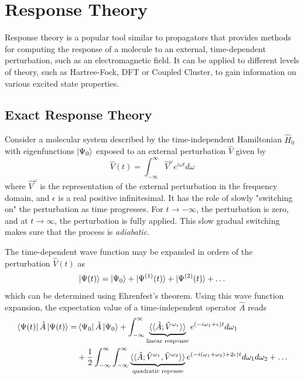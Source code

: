 \section{Response Theory}

Response theory is a popular tool similar to propagators that provides methods for computing the response of a molecule to an external, time-dependent perturbation, such as an electromagnetic field. It can be applied to different levels of theory, such as Hartree-Fock, DFT or Coupled Cluster, to gain information on various excited state properties.

\subsection{Exact Response Theory}

Consider a molecular system described by the time-independent Hamiltonian $\hat{H}_0$ with eigenfunctions $\ket{\Psi_0}$ exposed to
an external perturbation $\hat{V}$ given by \cite{Koc1990}
\begin{equation}
\hat{V}(t) = \int_{-\infty}^{\infty} \hat{V}^{\omega} e^{i\omega t  } d\omega
\end{equation}
\noindent where $\hat{V}^{\omega}$ is the representation of the external perturbation in the frequency domain, and $\epsilon$ is a real positive infinitesimal. It has the role of slowly "switching on" the perturbation as time progresses. For $t\rightarrow -\infty$, the perturbation is zero, and at $t \rightarrow \infty$, the perturbation is fully applied. This slow gradual switching makes sure that the process is \emph{adiabatic}.

The time-dependent wave function may be expanded in orders of the perturbation $\hat{V}(t)$ as
\begin{equation}
\ket{\smash{\Psi (t)}} = \ket{\smash{\Psi_0}} + \ket{\smash{\Psi^{(1)}(t)}} + \ket{\smash{\Psi^{(2)}(t)}} + \ldots
\end{equation}
\noindent which can be determined using Ehrenfest's theorem. Using this wave function expansion, the expectation value of a time-independent operator $\hat{A}$ reads
\begin{equation}
\begin{split}
\bra{\smash{\Psi (t)}} \hat{A} \ket{\smash{\Psi (t)}} = & \bra{\smash{\Psi_0}} \hat{A} \ket{\smash{\Psi_0}} + \int_{-\infty}^{\infty} 
\underbrace{ \langle\langle \hat{A}; \hat{V}^{\omega_1}
\rangle\rangle}_{\text{linear response}} 
e^{(-i\omega_1 + \epsilon)t} d\omega_1 \\
&+ \frac{1}{2} \int_{-\infty}^{\infty} \int_{-\infty}^{\infty}
\underbrace{ \langle\langle \hat{A}; \hat{V}^{\omega_1},\hat{V}^{\omega_2} \rangle\rangle 
}_{\text{quadratic reponse}}
e^{(-i(\omega_1+\omega_2) + 2\epsilon)t} d\omega_1 d\omega_2  + \ldots
\end{split}
\label{eq:TIMEEXP}
\end{equation}

